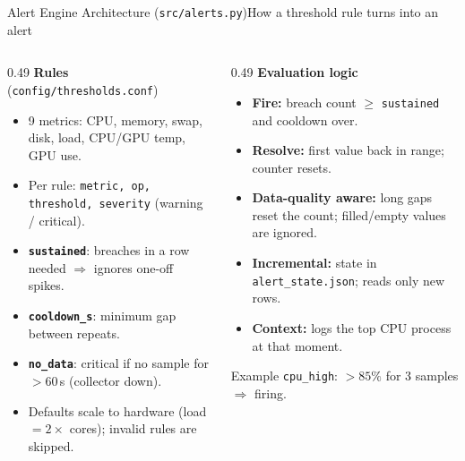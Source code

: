 \documentclass[aspectratio=169,10pt]{beamer}
\begin{document}
{\begin{frame}{Alert Engine Architecture (\texttt{src/alerts.py})}{How a threshold rule turns into an alert}
\vspace{0.3em}
\footnotesize
\begin{columns}[T]
\begin{column}{0.49\textwidth}
\textbf{Rules} (\texttt{config/thresholds.conf})
\begin{itemize}
  \item 9 metrics: CPU, memory, swap, disk, load, CPU/GPU temp, GPU use.
  \item Per rule: \texttt{metric, op, threshold, severity} (warning / critical).
  \item \textbf{\texttt{sustained}}: breaches in a row needed $\Rightarrow$ ignores one-off spikes.
  \item \textbf{\texttt{cooldown\_s}}: minimum gap between repeats.
  \item \textbf{\texttt{no\_data}}: critical if no sample for $>60$\,s (collector down).
  \item Defaults scale to hardware (load $=2\times$ cores); invalid rules are skipped.
\end{itemize}
\end{column}
\begin{column}{0.49\textwidth}
\textbf{Evaluation logic}
\begin{itemize}
  \item \textbf{Fire:} breach count $\ge$ \texttt{sustained} and cooldown over.
  \item \textbf{Resolve:} first value back in range; counter resets.
  \item \textbf{Data-quality aware:} long gaps reset the count; filled/empty values are ignored.
  \item \textbf{Incremental:} state in \texttt{alert\_state.json}; reads only new rows.
  \item \textbf{Context:} logs the top CPU process at that moment.
\end{itemize}
\begin{block}{Example}
\texttt{cpu\_high}: $>85\%$ for 3 samples $\Rightarrow$ firing.
\end{block}
\end{column}
\end{columns}
\end{frame}

}
\end{document}
